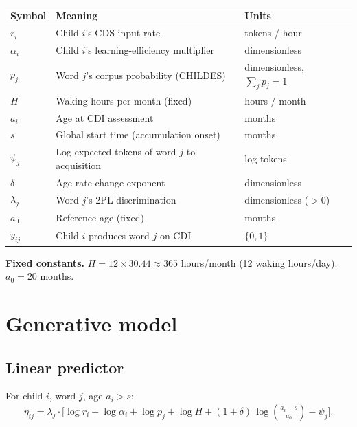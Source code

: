 \documentclass[11pt]{article}
\begin{document}
\begin{center}
\small
\begin{tabular}{@{}lll@{}}
\toprule
Symbol & Meaning & Units \\
\midrule
\(r_i\)         & Child \(i\)'s CDS input rate                & tokens / hour \\
\(\alpha_i\)    & Child \(i\)'s learning-efficiency multiplier & dimensionless \\
\(p_j\)         & Word \(j\)'s corpus probability (CHILDES)   & dimensionless, \(\sum_j p_j = 1\) \\
\(H\)           & Waking hours per month (fixed)              & hours / month \\
\(a_i\)         & Age at CDI assessment                       & months \\
\(s\)           & Global start time (accumulation onset)      & months \\
\(\psi_j\)      & Log expected tokens of word \(j\) to acquisition & log-tokens \\
\(\delta\)      & Age rate-change exponent                    & dimensionless \\
\(\lambda_j\)   & Word \(j\)'s 2PL discrimination             & dimensionless ($>0$) \\
\(a_0\)         & Reference age (fixed)                       & months \\
\(y_{ij}\)      & Child \(i\) produces word \(j\) on CDI      & \(\{0, 1\}\) \\
\bottomrule
\end{tabular}
\end{center}

\textbf{Fixed constants.} \(H = 12 \times 30.44 \approx 365\) hours/month
(12 waking hours/day). \(a_0 = 20\) months.

\section{Generative model}

\subsection{Linear predictor}

For child \(i\), word \(j\), age \(a_i > s\):
\begin{equation}
\eta_{ij}
= \lambda_j \cdot \Big[ \log r_i + \log \alpha_i
+ \log p_j + \log H
+ (1+\delta)\,\log\!\left(\tfrac{a_i - s}{a_0}\right)
- \psi_j \Big].
\label{eq:eta}
\end{equation}
\end{document}
